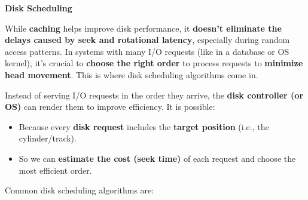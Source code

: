 \newpage

\begin{flushleft}
    \textcolor{Green3}{ \textbf{Disk Scheduling}}
\end{flushleft}
While \textbf{caching} helps improve disk performance, it \textbf{doesn't eliminate the delays caused by seek and rotational latency}, especially during random access patterns. In systems with many I/O requests (like in a database or OS kernel), it's crucial to \textbf{choose the right order} to process requests to \textbf{minimize head movement}. This is where disk scheduling algorithms come in.

\highspace
Instead of serving I/O requests in the order they arrive, the \textbf{disk controller (or OS)} can render them to improve efficiency. It is possible:
\begin{itemize}
    \item Because every \textbf{disk request} includes the \textbf{target position} (i.e., the cylinder/track).
    \item So we can \textbf{estimate the cost (seek time)} of each request and choose the most efficient order.
\end{itemize}
Common disk scheduling algorithms are:
